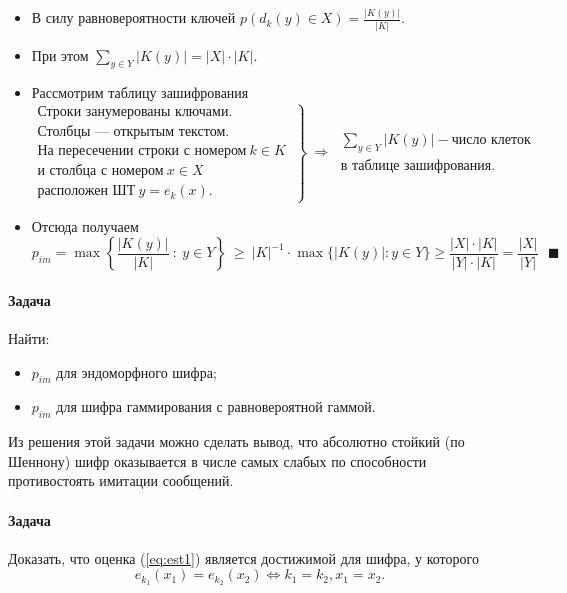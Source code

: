 \documentclass[a4paper,12pt]{article}
\newcommand{\refeq}[1]{(\ref{#1})}
\begin{document}
\begin{itemize}
	\item В силу равновероятности ключей $p(d_k(y)\in X) = \frac{|K(y)|}{|K|}$.
	\item При этом $\sum_{y\in Y} |K(y)| = |X|\cdot |K|$.
	\item Рассмотрим таблицу зашифрования
	$$
	\left.
	\begin{matrix}
		\text{Строки занумерованы ключами.} \\
		\text{Столбцы --- открытым текстом.} \\
		\text{На пересечении}\text{ строки с номером} ~ k \in K ~\\
		\text{и столбца с номером} ~ x \in X ~ \\
		\text{расположен ШТ} ~ y=e_k(x).
	\end{matrix}
	\right\} ~\Rightarrow ~ \begin{matrix} \sum_{y\in Y}|K(y)| - \text{число клеток}\\ \text{в таблице зашифрования}.\end{matrix}
	$$
	\item Отсюда получаем $$
	p_{im} = \max \left\{\frac{|K(y)|}{|K|} ~:~ y\in Y \right\} ~\ge~ |K|^{-1} \cdot \max\{|K(y)| : y \in Y \} \ge \frac{|X| \cdot |K|}{|Y| \cdot |K|} = \frac{|X|}{|Y|} ~~~\blacksquare
	$$
\end{itemize}

\paragraph{Задача}

Найти:
\begin{itemize}
	\item $p_{im}$ для эндоморфного шифра;
	\item $p_{im}$ для шифра гаммирования с равновероятной гаммой.
\end{itemize}

Из решения этой задачи можно сделать вывод, что абсолютно стойкий (по Шеннону) шифр оказывается в числе самых слабых по способности противостоять имитации
сообщений.

\paragraph{Задача}

Доказать, что оценка \refeq{eq:est1} является достижимой для шифра, у которого
$$
e_{k_1}(x_1) = e_{k_2}(x_2) \Leftrightarrow k_1 = k_2, x_1 = x_2.
$$
\end{document}
